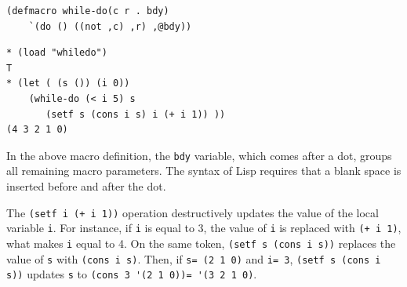 \documentclass[a4paper,12pt]{book}
\newenvironment{fmpage}[1]
           {\begin{lrbox}{\fmbox}\begin{minipage}{#1}}
           {\end{minipage}\end{lrbox}\fbox{\usebox{\fmbox}}}
\begin{document}
\begin{verbatim}
(defmacro while-do(c r . bdy)
    `(do () ((not ,c) ,r) ,@bdy))
\end{verbatim}
\begin{fmpage}{0.8\linewidth}
\begin{verbatim}
* (load "whiledo")
T
* (let ( (s ()) (i 0))
    (while-do (< i 5) s
       (setf s (cons i s) i (+ i 1)) ))
(4 3 2 1 0)
\end{verbatim}
\end{fmpage}


In the above macro definition, the  \verb|bdy| variable,
which comes after a dot, groups all remaining macro
parameters. The syntax of Lisp requires that a blank space
is inserted before and after the dot.

The \verb|(setf i (+ i 1))| operation destructively updates
the value of the local variable \verb|i|. For instance,
if \verb|i| is equal to 3, the value of \verb|i| is replaced
with \verb|(+ i 1)|, what makes \verb|i| equal to 4. On the
same token, \verb|(setf s (cons i s))| replaces the value
of \verb|s| with \verb|(cons i s)|. Then, if \verb|s= (2 1 0)|
and \verb|i= 3|, \verb|(setf s (cons i s))| updates \verb|s|
to \verb|(cons 3 '(2 1 0))= '(3 2 1 0)|.
\end{document}
